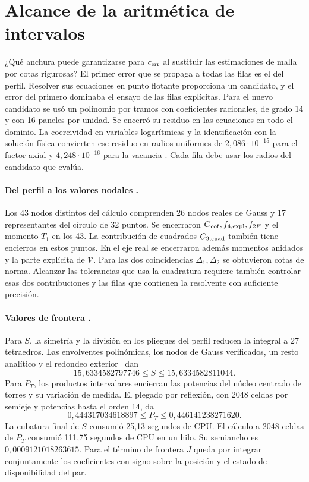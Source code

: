 \section{Alcance de la aritmética de intervalos}\label{sec:numcert}
¿Qué anchura puede garantizarse para $c_{\mathrm{err}}$ al sustituir las estimaciones de malla por cotas
rigurosas? El primer error que se propaga a todas las filas es el del perfil. Resolver sus
ecuaciones en punto flotante proporciona un candidato, y el error del primero dominaba el ensayo
de las filas explícitas. Para el nuevo candidato se usó un polinomio por tramos con coeficientes
racionales, de grado 14 y con 16 paneles por unidad. Se encerró su residuo en las ecuaciones en
todo el dominio. La coercividad en variables logarítmicas y la identificación con la solución
física convierten ese residuo en radios uniformes de $2{,}086\cdot10^{-15}$ para el factor axial y
$4{,}248\cdot10^{-16}$ para la vacancia . Cada fila debe usar los radios del candidato que evalúa.

\paragraph{Del perfil a los valores nodales .}
Los 43 nodos distintos del cálculo comprenden 26 nodos reales de Gauss y 17 representantes del
círculo de 32 puntos. Se encerraron $G_{\rm cof}, f_{4,\rm expl}, f_{2F}$ y el momento $T_1$ en los 43.
La contribución de cuadrados $C_{3,\rm cuad}$ también tiene encierros en estos puntos. En el eje real se
encerraron además momentos anidados y la parte explícita de $\mathcal V$. Para las dos coincidencias
$\Delta_1,\Delta_2$ se obtuvieron cotas de norma. Alcanzar las
tolerancias que usa la cuadratura requiere también controlar esas dos contribuciones y las filas
que contienen la resolvente con suficiente precisión.

\paragraph{Valores de frontera .}\label{par:intervalos-frontera}
Para $S$, la simetría y la división en los pliegues del perfil reducen la integral a 27 tetraedros. Las
envolventes polinómicas, los nodos de Gauss verificados, un resto analítico y el redondeo
exterior~\cite{mkc,tucker} dan
\[
 15{,}6334582797746\le S\le 15{,}6334582811044 .
\]
Para $P_T$, los productos intervalares encierran las potencias del núcleo centrado de torres y su
variación de medida. El plegado por reflexión, con 2048 celdas por semieje y potencias hasta el orden
14, da
\[
 0{,}444317034618897\le P_T\le 0{,}446141238271620 .
\]
La cubatura final de $S$ consumió 25,13 segundos de CPU. El cálculo a 2048 celdas de $P_T$ consumió
111,75 segundos de CPU en un hilo. Su semiancho es $0{,}0009121018263615$. Para el término de frontera
$J$ queda por integrar conjuntamente los coeficientes con signo sobre la posición y el estado de
disponibilidad del par.

